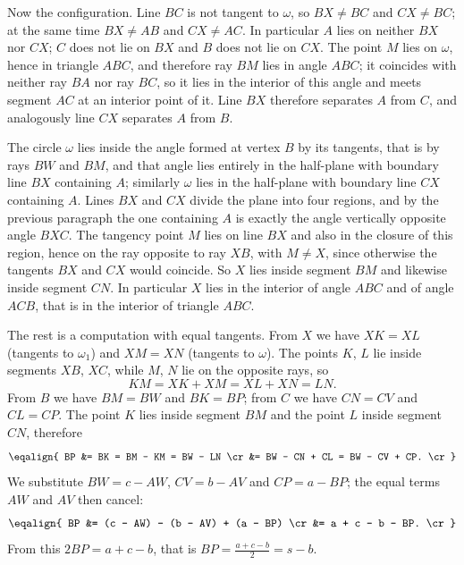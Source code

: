 {    Now the configuration. Line $BC$ is not tangent to $\omega$, so $BX \neq BC$ and $CX \neq BC$; at the same time $BX \neq AB$ and $CX \neq AC$. In particular $A$ lies on neither $BX$ nor $CX$; $C$ does not lie on $BX$ and $B$ does not lie on $CX$. The point $M$ lies on $\omega$, hence in triangle $ABC$, and therefore ray $BM$ lies in angle $ABC$; it coincides with neither ray $BA$ nor ray $BC$, so it lies in the interior of this angle and meets segment $AC$ at an interior point of it. Line $BX$ therefore separates $A$ from $C$, and analogously line $CX$ separates $A$ from $B$.

    The circle $\omega$ lies inside the angle formed at vertex $B$ by its tangents, that is by rays $BW$ and $BM$, and that angle lies entirely in the half-plane with boundary line $BX$ containing $A$; similarly $\omega$ lies in the half-plane with boundary line $CX$ containing $A$. Lines $BX$ and $CX$ divide the plane into four regions, and by the previous paragraph the one containing $A$ is exactly the angle vertically opposite angle $BXC$. The tangency point $M$ lies on line $BX$ and also in the closure of this region, hence on the ray opposite to ray $XB$, with $M \neq X$, since otherwise the tangents $BX$ and $CX$ would coincide. So $X$ lies inside segment $BM$ and likewise inside segment $CN$. In particular $X$ lies in the interior of angle $ABC$ and of angle $ACB$, that is in the interior of triangle $ABC$.

    The rest is a computation with equal tangents. From $X$ we have $XK = XL$ (tangents to $\omega_1$) and $XM = XN$ (tangents to $\omega$). The points $K$, $L$ lie inside segments $XB$, $XC$, while $M$, $N$ lie on the opposite rays, so
    $$
    KM = XK + XM = XL + XN = LN.
    $$
    From $B$ we have $BM = BW$ and $BK = BP$; from $C$ we have $CN = CV$ and $CL = CP$. The point $K$ lies inside segment $BM$ and the point $L$ inside segment $CN$, therefore
    $$
    \eqalign{
    BP &= BK = BM - KM = BW - LN \cr
       &= BW - CN + CL = BW - CV + CP. \cr
    }
    $$
    We substitute $BW = c - AW$, $CV = b - AV$ and $CP = a - BP$; the equal terms $AW$ and $AV$ then cancel:
    $$
    \eqalign{
    BP &= (c - AW) - (b - AV) + (a - BP) \cr
       &= a + c - b - BP. \cr
    }
    $$
    From this $2BP = a + c - b$, that is $BP = \frac{a+c-b}{2} = s - b$.

}
